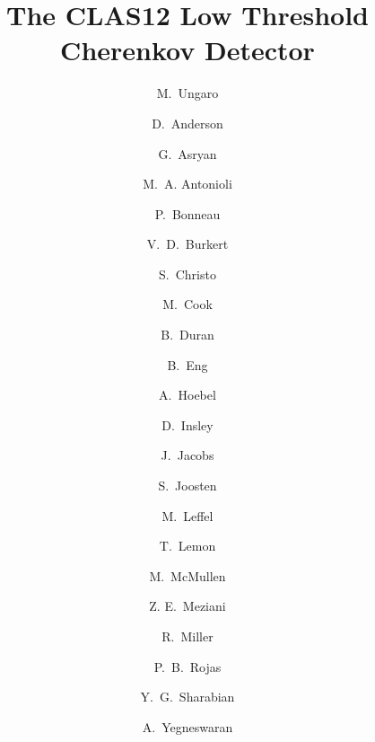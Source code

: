 \title{The CLAS12 Low Threshold Cherenkov Detector}

\author[JLAB]{M.~Ungaro}
\author[JLAB]{D.~Anderson}      %
\author[JLAB]{G.~Asryan}        %
\author[JLAB]{M.~A. Antonioli}  %
\author[JLAB]{P.~Bonneau}       %
\author[JLAB]{V.~D.~Burkert}     %
\author[JLAB]{S.~Christo}       %
\author[JLAB]{M.~Cook}          %
\author[TEMPLE]{B.~Duran}    %
\author[JLAB]{B.~Eng}           %
\author[JLAB]{A.~Hoebel}        %
\author[JLAB]{D.~Insley}        %
\author[JLAB]{J.~Jacobs}        %
\author[ARGONNE]{S.~Joosten} %
\author[JLAB]{M.~Leffel}        %
\author[JLAB]{T.~Lemon}         %
\author[JLAB]{M.~McMullen}      %
\author[TEMPLE,ARGONNE]{Z. E.~Meziani}   %
\author[JLAB]{R.~Miller}        %
\author[JLAB]{P.~B.~Rojas}       %
\author[JLAB]{Y.~G.~Sharabian}  %
\author[JLAB]{A.~Yegneswaran}   %

\address[JLAB]{Thomas Jefferson National Accelerator Facility, Newport News, VA 23606, USA}
\address[TEMPLE]{Temple University, Philadelphia, PA 19122, USA}
\address[ARGONNE]{Argonne National Laboratory, Lemont, IL 60439, USA}
